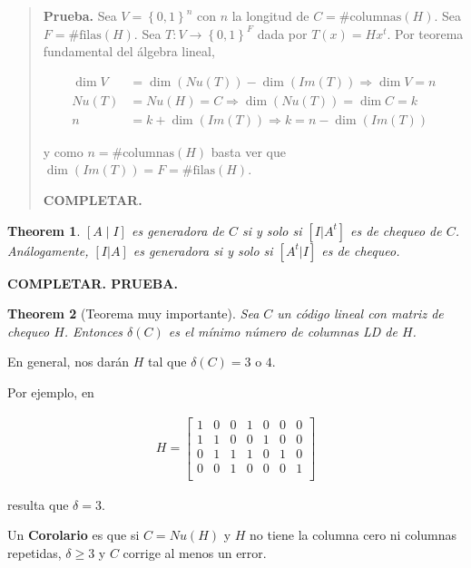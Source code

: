 \documentclass[a4paper]{article}
\newtheorem{theorem}{Theorem}
\newtheorem{theorem}{Theorem}
\begin{document}
\small
\begin{quote}

\textbf{Prueba.} Sea $V = \left\{ 0, 1 \right\}^n $ con $n$ la longitud de $C =
\#\text{columnas}(H)$. Sea $F = \#\text{filas}(H)$. Sea $T : V \to \left\{ 0, 1
\right\}^F $ dada por $T(x) = Hx^t$. Por teorema fundamental del álgebra lineal, 

\begin{align*}
    \dim V &= \dim (Nu (T)) - \dim (Im(T)) \Rightarrow \dim V = n \\ 
    Nu(T) &= Nu(H) = C \Rightarrow \dim (Nu(T)) = \dim C = k \\ 
    n &= k + \dim (Im(T)) \Rightarrow k = n - \dim (Im(T))
\end{align*}

y como $n = \# \text{columnas}(H)$ basta ver que $\dim(Im(T)) = F = \#
\text{filas}(H)$.

\textbf{COMPLETAR.}

\end{quote}
\normalsize

\begin{theorem}
    $[A \mid I]$ es generadora de $C$ si y solo si $[I | A^t]$ es de chequeo de $C$.
    Análogamente, $[I|A]$ es generadora si y solo si $[A^t|I]$ es de chequeo.
\end{theorem}

\textbf{COMPLETAR. PRUEBA.}

\begin{theorem}[Teorema muy importante]
    Sea $C$ un código lineal con matriz de chequeo $H$. Entonces $\delta(C)$ es el 
    mínimo número de columnas LD de $H$.
\end{theorem}

En general, nos darán $H$ tal que $\delta(C) = 3$ o $4$.

Por ejemplo, en 

\begin{align*}
    H = \begin{bmatrix} 
        1 & 0 & 0 & 1 & 0 & 0 & 0 \\ 
        1 & 1 & 0 & 0 & 1 & 0 & 0 \\ 
        0 & 1 & 1 & 1 & 0 & 1 & 0 \\ 
        0 & 0 & 1 & 0 & 0 & 0 & 1 \\ 
    \end{bmatrix} 
\end{align*}

resulta que $\delta = 3$.

Un \textbf{Corolario} es que si $C = Nu(H)$ y $H$ no tiene la columna 
cero ni columnas repetidas, $\delta \geq 3$ y $C$ corrige 
al menos un error. 
\end{document}
